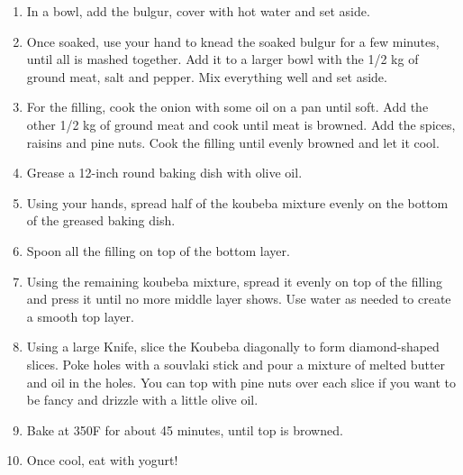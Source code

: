 \begin{enumerate}
    \item In a bowl, add the bulgur, cover with hot water and set aside.
    \item Once soaked, use your hand to knead the soaked bulgur for a few minutes, until all is mashed together. Add it to a larger bowl with the 1/2 kg of ground meat, salt and pepper. Mix everything well and set aside.
    \item For the filling, cook the onion with some oil on a pan until soft. Add the other 1/2 kg of ground meat and cook until meat is browned. Add the spices, raisins and pine nuts. Cook the filling until evenly browned and let it cool.
    \item Grease a 12-inch round baking dish with olive oil.
    \item Using your hands, spread half of the koubeba mixture evenly on the bottom of the greased baking dish.
    \item Spoon all the filling on top of the bottom layer.
    \item Using the remaining koubeba mixture, spread it evenly on top of the filling and press it until no more middle layer shows. Use water as needed to create a smooth top layer.
    \item Using a large Knife, slice the Koubeba diagonally to form diamond-shaped slices. Poke holes with a souvlaki stick and pour a mixture of melted butter and oil in the holes. You can top with pine nuts over each slice if you want to be fancy and drizzle with a little olive oil.
    \item Bake at 350\degree F for about 45 minutes, until top is browned.
    \item Once cool, eat with yogurt!
\end{enumerate}
